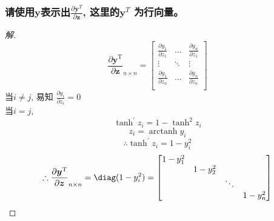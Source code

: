 \documentclass[a4paper]{article}
\DeclareMathOperator{\arctanh}{arctanh}
\begin{document}
\subsubsection{请使用$\mathbf{y}$表示出$\frac{\partial \mathbf{y}^T}{\partial \mathbf{z}}$, 这里的$\mathbf{y}^T$ 为行向量。}
\begin{proof}[解]
    
    \[\frac{\partial \boldsymbol{y}^\mathrm{T}}{\partial \boldsymbol{z}}_{n \times n} = 
    \begin{bmatrix}
        \frac{\partial y_1}{\partial z_1} & \dots & \frac{\partial y_n}{\partial z_1} \\
        \vdots & \ddots & \vdots \\
        \frac{\partial y_1}{\partial z_n} & \dots & \frac{\partial y_n}{\partial z_n} \\
    \end{bmatrix}\]
    当$i \neq j$, 易知 $\frac{\partial y_i}{\partial z_i} = 0$ \\
    当$i = j$, 
    \[\tanh^\prime z_i = 1 - \tanh ^2 z_i\]
    \[ z_i = \arctanh  y_i\]
    \[\therefore \tanh^\prime z_i = 1 - y_i^2\]
    \[\therefore \frac{\partial \boldsymbol y^\mathrm{T}}{\partial \boldsymbol z}_{n \times n} = \diag (1 - y_i^2) = 
    \begin{bmatrix}
        1 - y_1^2 & & & \\
         & 1 - y_2^2 & & \\
         & & \ddots & \\
         & & & 1 - y_n^2 \\
    \end{bmatrix}\]
\end{proof}
\end{document}
